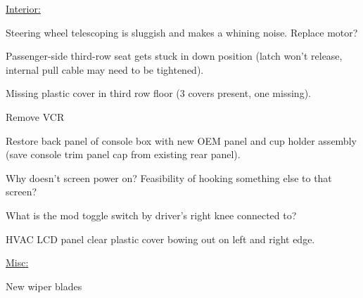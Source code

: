 \documentclass[12pt]{article}
\newcommand{\cmark}{\ding{51}}%
\newcommand{\xmark}{\ding{55}}%
\newcommand{\done}{\rlap{$\square$}{\raisebox{2pt}{\large\hspace{1pt}\cmark}}%
\hspace{-2.5pt}}
\newcommand{\wontfix}{\rlap{$\square$}{\large\hspace{1pt}\xmark}}
\begin{document}
\vspace{0.25in}

\underline{\large Interior:}

\begin{todolist}
\item Steering wheel telescoping is sluggish and makes a whining noise.  Replace motor?
\item Passenger-side third-row seat gets stuck in down position (latch won't release, internal pull cable may need to be tightened).
\item Missing plastic cover in third row floor (3 covers present, one missing).
\item Remove VCR
\item Restore back panel of console box with new OEM panel and cup holder assembly (save console trim panel cap from existing rear panel).
\item Why doesn't screen power on?  Feasibility of hooking something else to that screen?
\item What is the mod toggle switch by driver's right knee connected to?
\item HVAC LCD panel clear plastic cover bowing out on left and right edge.
\end{todolist}


\vspace{0.25in}

\underline{\large Misc:}

\begin{todolist}
\item New wiper blades
\end{todolist}

\end{document}
